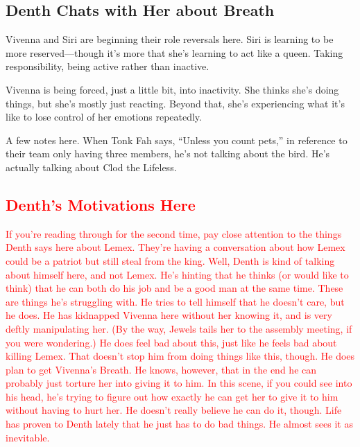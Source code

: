 \subsection*{Denth Chats with Her about Breath}

Vivenna and Siri are beginning their role reversals here. Siri is learning to be more reserved—though it’s more that she’s learning to act like a queen. Taking responsibility, being active rather than inactive.

Vivenna is being forced, just a little bit, into inactivity. She thinks she’s doing things, but she’s mostly just reacting. Beyond that, she’s experiencing what it’s like to lose control of her emotions repeatedly.

A few notes here. When Tonk Fah says, “Unless you count pets,” in reference to their team only having three members, he’s not talking about the bird. He’s actually talking about Clod the Lifeless.

\textcolor{red}{
\subsection*{Denth’s Motivations Here}
}
\textcolor{red}{
If you’re reading through for the second time, pay close attention to the things Denth says here about Lemex. They’re having a conversation about how Lemex could be a patriot but still steal from the king. Well, Denth is kind of talking about himself here, and not Lemex. He’s hinting that he thinks (or would like to think) that he can both do his job and be a good man at the same time.
}
\textcolor{red}{
These are things he’s struggling with. He tries to tell himself that he doesn’t care, but he does. He has kidnapped Vivenna here without her knowing it, and is very deftly manipulating her. (By the way, Jewels tails her to the assembly meeting, if you were wondering.) He does feel bad about this, just like he feels bad about killing Lemex. That doesn’t stop him from doing things like this, though.
}
\textcolor{red}{
He does plan to get Vivenna’s Breath. He knows, however, that in the end he can probably just torture her into giving it to him. In this scene, if you could see into his head, he’s trying to figure out how exactly he can get her to give it to him without having to hurt her.
}
\textcolor{red}{
He doesn’t really believe he can do it, though. Life has proven to Denth lately that he just has to do bad things. He almost sees it as inevitable.
}



